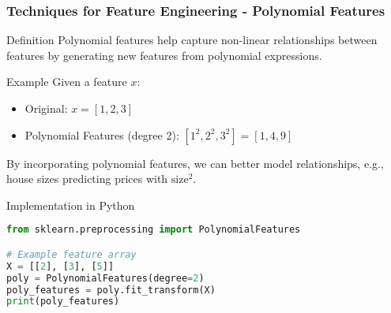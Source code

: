\documentclass[aspectratio=169]{beamer}
\begin{document}
\begin{frame}[fragile]
    \frametitle{Techniques for Feature Engineering - Polynomial Features}
    \begin{block}{Definition}
        Polynomial features help capture non-linear relationships between features by generating new features from polynomial expressions.
    \end{block}
    
    \begin{block}{Example}
        Given a feature \( x \):
        \begin{itemize}
            \item Original: \( x = [1, 2, 3] \)
            \item Polynomial Features (degree 2): \( [1^2, 2^2, 3^2] = [1, 4, 9] \)
        \end{itemize}
        By incorporating polynomial features, we can better model relationships, e.g., house sizes predicting prices with \( \text{size}^2 \).
    \end{block}
    
    \begin{block}{Implementation in Python}
        \begin{lstlisting}[language=Python]
from sklearn.preprocessing import PolynomialFeatures

# Example feature array
X = [[2], [3], [5]]
poly = PolynomialFeatures(degree=2)
poly_features = poly.fit_transform(X)
print(poly_features)
        \end{lstlisting}
    \end{block}
\end{frame}
\end{document}
